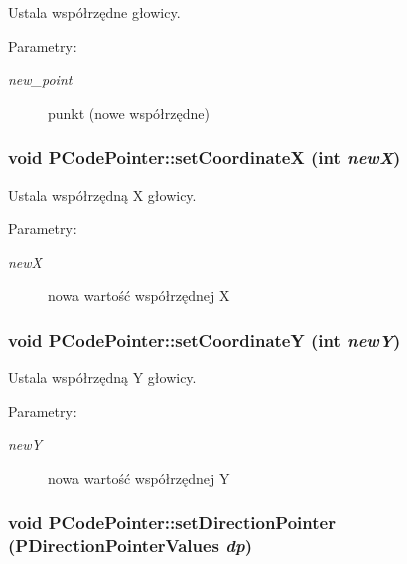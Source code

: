 Ustala współrzędne głowicy. \begin{Desc}
\item[Parametry:]
\begin{description}
\item[{\em new\_\-point}]punkt (nowe współrzędne) \end{description}
\end{Desc}
\hypertarget{classPCodePointer_9bcf58c97f704e3be2deefb588f91312}{
\subsubsection[{setCoordinateX}]{\setlength{\rightskip}{0pt plus 5cm}void PCodePointer::setCoordinateX (int {\em newX})}}
\label{classPCodePointer_9bcf58c97f704e3be2deefb588f91312}


Ustala współrzędną X głowicy. \begin{Desc}
\item[Parametry:]
\begin{description}
\item[{\em newX}]nowa wartość współrzędnej X \end{description}
\end{Desc}
\hypertarget{classPCodePointer_9fd77f14e39cc30f8cfc583ce97aa2f2}{
\subsubsection[{setCoordinateY}]{\setlength{\rightskip}{0pt plus 5cm}void PCodePointer::setCoordinateY (int {\em newY})}}
\label{classPCodePointer_9fd77f14e39cc30f8cfc583ce97aa2f2}


Ustala współrzędną Y głowicy. \begin{Desc}
\item[Parametry:]
\begin{description}
\item[{\em newY}]nowa wartość współrzędnej Y \end{description}
\end{Desc}
\hypertarget{classPCodePointer_0b97bd6b4383e976e54c5738178c7815}{
\subsubsection[{setDirectionPointer}]{\setlength{\rightskip}{0pt plus 5cm}void PCodePointer::setDirectionPointer ({\bf PDirectionPointerValues} {\em dp})}}
\label{classPCodePointer_0b97bd6b4383e976e54c5738178c7815}


